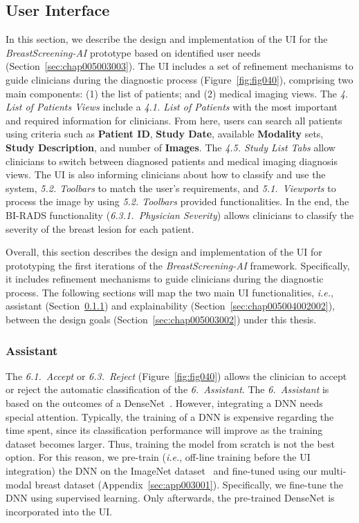 \subsection{User Interface}
\label{sec:chap005004002}

In this section, we describe the design and implementation of the \ac{UI} for the {\it BreastScreening-AI} prototype based on identified user needs (Section~\ref{sec:chap005003003}).
The \ac{UI} includes a set of refinement mechanisms to guide clinicians during the diagnostic process (Figure~\ref{fig:fig040}), comprising two main components:
(1) the list of patients; and
(2) medical imaging views.
The {\it 4. List of Patients Views} include a {\it 4.1. List of Patients} with the most important and required information for clinicians.
From here, users can search all patients using criteria such as {\bf Patient ID}, {\bf Study Date}, available {\bf Modality} sets, {\bf Study Description}, and number of {\bf Images}.
The {\it 4.5. Study List Tabs} allow clinicians to switch between diagnosed patients and medical imaging diagnosis views.
The \ac{UI} is also informing clinicians about how to classify and use the system, {\it 5.2. Toolbars} to match the user's requirements, and {\it 5.1.~Viewports} to process the image by using {\it 5.2. Toolbars} provided functionalities.
In the end, the \ac{BI-RADS} functionality ({\it 6.3.1.~Physician Severity}) allows clinicians to classify the severity of the breast lesion for each patient.

Overall, this section describes the design and implementation of the \ac{UI} for prototyping the first iterations of the {\it BreastScreening-AI} framework.
Specifically, it includes refinement mechanisms to guide clinicians during the diagnostic process.
The following sections will map the two main \ac{UI} functionalities, {\it i.e.}, assistant (Section~\ref{sec:chap005004002001}) and explainability (Section~\ref{sec:chap005004002002}), between the design goals (Section~\ref{sec:chap005003002}) under this thesis.

\subsubsection{Assistant}
\label{sec:chap005004002001}

The {\it 6.1.~Accept} or {\it 6.3.~Reject} (Figure~\ref{fig:fig040}) allows the clinician to accept or reject the automatic classification of the {\it 6.~Assistant}.
The {\it 6.~Assistant} is based on the outcomes of a DenseNet~\cite{Huang_2017_CVPR}.
However, integrating a \ac{DNN} needs special attention.
Typically, the training of a \ac{DNN} is expensive regarding the time spent, since its classification performance will improve as the training dataset becomes larger.
Thus, training the model from scratch is not the best option.
For this reason, we pre-train ({\it i.e.}, off-line training before the \ac{UI} integration) the \ac{DNN} on the ImageNet dataset~\cite{10.1145/3351095.3375709} and fine-tuned using our multi-modal breast dataset (Appendix~\ref{sec:app003001}).
Specifically, we fine-tune the \ac{DNN} using supervised learning.
Only afterwards, the pre-trained DenseNet is incorporated into the \ac{UI}.

